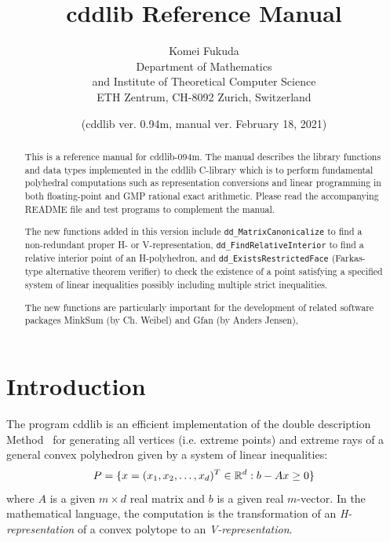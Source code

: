 \documentclass[11pt]{article}
\newcommand {\0} {{\bf 0}}
\newcommand{\R}{{\Bbb R}}
\begin{document}
\title{cddlib Reference Manual}
\author{Komei Fukuda\\
Department of Mathematics\\
and Institute of Theoretical Computer Science\\
ETH Zentrum, CH-8092 Zurich, Switzerland\\
}
\date{ (cddlib ver. 0.94m, manual ver. February 18, 2021)}

\maketitle

\tableofcontents

\begin{abstract}
This is a reference manual for cddlib-094m.
The manual describes the library functions and data types implemented
in the cddlib C-library which is to perform fundamental polyhedral
computations such as representation conversions and linear programming
in both floating-point and GMP rational exact arithmetic.
Please read the accompanying README file and test programs to
complement the manual.

The new functions added in this version include {\tt dd\_MatrixCanonicalize}
to find a non-redundant proper H- or V-representation,
{\tt dd\_FindRelativeInterior} to find a relative interior point
of an H-polyhedron, and  {\tt dd\_ExistsRestrictedFace} (Farkas-type
alternative theorem verifier)
to check the existence of a point satisfying a specified system
of linear inequalities possibly including multiple strict inequalities.

The new functions are particularly important for the development of
related software packages MinkSum (by Ch. Weibel) and Gfan
(by Anders Jensen),

\end{abstract}

\section{Introduction} \label{INTRODUCTION}

The program  cddlib  is an efficient implementation \cite{fp-ddmr-96}  of
the double description Method~\cite{mrtt-ddm-53}
for generating  all vertices (i.e. extreme points)
and extreme rays of a general
convex polyhedron given by
a system of linear inequalities:
\[
   P = \{ x=(x_1, x_2, \ldots, x_d)^T \in \R^{d}:  b - A  x  \ge 0 \}
\]
where $A$ is a given $m \times d$ real matrix and
$b$ is a given real $m$-vector.   In the mathematical
language, the computation is the transformation
of an {\em H-representation\/} of a convex polytope
to an {\em V-representation}.
\end{document}
